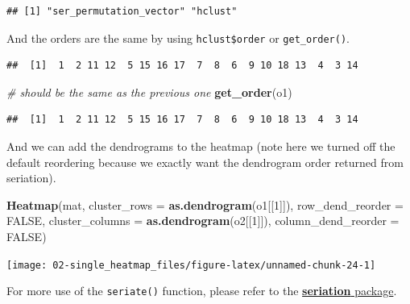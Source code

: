 \documentclass[]{book}
\newenvironment{Shaded}{\begin{snugshade}}{\end{snugshade}}
\newcommand{\KeywordTok}[1]{\textcolor[rgb]{0.13,0.29,0.53}{\textbf{#1}}}
\newcommand{\DataTypeTok}[1]{\textcolor[rgb]{0.13,0.29,0.53}{#1}}
\newcommand{\DecValTok}[1]{\textcolor[rgb]{0.00,0.00,0.81}{#1}}
\newcommand{\CommentTok}[1]{\textcolor[rgb]{0.56,0.35,0.01}{\textit{#1}}}
\newcommand{\OtherTok}[1]{\textcolor[rgb]{0.56,0.35,0.01}{#1}}
\newcommand{\OperatorTok}[1]{\textcolor[rgb]{0.81,0.36,0.00}{\textbf{#1}}}
\newcommand{\NormalTok}[1]{#1}
\theoremstyle{definition}
\theoremstyle{definition}
\theoremstyle{definition}
\theoremstyle{remark}
\begin{document}
\begin{verbatim}
## [1] "ser_permutation_vector" "hclust"
\end{verbatim}

And the orders are the same by using \texttt{hclust\$order} or
\texttt{get\_order()}.

\begin{Shaded}
\end{Shaded}

\begin{verbatim}
##  [1]  1  2 11 12  5 15 16 17  7  8  6  9 10 18 13  4  3 14
\end{verbatim}

\begin{Shaded}
\begin{Highlighting}[]
\CommentTok{# should be the same as the previous one}
\KeywordTok{get_order}\NormalTok{(o1)}
\end{Highlighting}
\end{Shaded}

\begin{verbatim}
##  [1]  1  2 11 12  5 15 16 17  7  8  6  9 10 18 13  4  3 14
\end{verbatim}

And we can add the dendrograms to the heatmap (note here we turned off
the default reordering because we exactly want the dendrogram order
returned from seriation).

\begin{Shaded}
\begin{Highlighting}[]
\KeywordTok{Heatmap}\NormalTok{(mat, }\DataTypeTok{cluster_rows =} \KeywordTok{as.dendrogram}\NormalTok{(o1[[}\DecValTok{1}\NormalTok{]]), }\DataTypeTok{row_dend_reorder =} \OtherTok{FALSE}\NormalTok{,}
    \DataTypeTok{cluster_columns =} \KeywordTok{as.dendrogram}\NormalTok{(o2[[}\DecValTok{1}\NormalTok{]]), }\DataTypeTok{column_dend_reorder =} \OtherTok{FALSE}\NormalTok{)}
\end{Highlighting}
\end{Shaded}

\begin{center}\texttt{[image: 02-single\_heatmap\_files/figure-latex/unnamed-chunk-24-1]} \end{center}

For more use of the \texttt{seriate()} function, please refer to the
\href{https://cran.r-project.org/web/packages/seriation/index.html}{\textbf{seriation}
package}.
\end{document}
